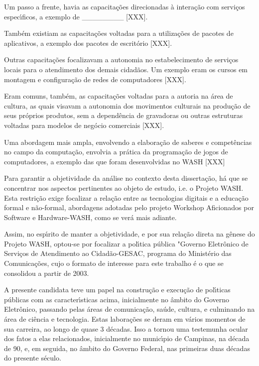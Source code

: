 \documentclass[
12pt,		%
openright,	%
twoside,  %
a4paper,			%
chapter=TITLE,		%
english,			%
french,				%
spanish,			%
brazil				%
]{USPSC-classe/USPSC}
\begin{document}
Um passo a frente, havia as capacita\c{c}\~oes direcionadas \`a intera\c{c}\~ao com servi\c{c}os espec\'{\i}ficos, a exemplo de \_\_\_\_\_\_\_\_ [XXX].




Tamb\'em existiam as capacita\c{c}\~oes voltadas para a utiliza\c{c}\~oes de pacotes de aplicativos, a exemplo dos pacotes de escrit\'orio [XXX].




Outras capacita\c{c}\~oes focalizavam a autonomia no estabelecimento de servi\c{c}os locais para o atendimento dos demais cidad\~aos. Um exemplo eram os cursos em montagem e configura\c{c}\~ao de redes de computadores [XXX].




Eram comuns, tamb\'em, as capacita\c{c}\~oes voltadas para a autoria na \'area de cultura, as quais visavam a autonomia dos movimentos culturais na produ\c{c}\~ao de seus pr\'oprios produtos, sem a depend\^encia de gravadoras ou outras estruturas voltadas para modelos de neg\'ocio comerciais [XXX].




Uma abordagem mais ampla, envolvendo a elabora\c{c}\~ao de saberes e compet\^encias no campo da computa\c{c}\~ao, envolvia a pr\'atica da programa\c{c}\~ao de jogos de computadores, a exemplo das que foram desenvolvidas no WASH [XXX]




Para garantir a objetividade da an\'alise no contexto desta disserta\c{c}\~ao, h\'a que se concentrar nos aspectos pertinentes ao objeto de estudo, i.e. o Projeto WASH. Esta restri\c{c}\~ao exige focalizar a rela\c{c}\~ao entre as tecnologias digitais e a educa\c{c}\~ao formal e n\~ao-formal, abordagens adotadas pelo projeto Workshop Aficionados por Software e Hardware-WASH, como se ver\'a mais adiante.




Assim, no esp\'{\i}rito de manter a objetividade, e por sua rela\c{c}\~ao direta na g\^enese do Projeto WASH, optou-se por focalizar a pol\'{\i}tica p\'ublica "Governo Eletr\^onico de Servi\c{c}os de Atendimento ao Cidad\~ao-GESAC, programa do  Minist\'erio das Comunica\c{c}\~oes, cujo o formato de interesse para este trabalho \'e o que se consolidou a partir de 2003.




A presente candidata teve um papel na constru\c{c}\~ao e execu\c{c}\~ao de pol\'{\i}ticas p\'ublicas com as caracter\'{\i}sticas acima, inicialmente no \^ambito do Governo Eletr\^onico, passando pelas \'areas de comunica\c{c}\~ao, sa\'ude, cultura, e culminando na \'area de ci\^encia e tecnologia. Estas labora\c{c}\~oes  se deram em v\'arios momentos de sua carreira, ao longo de quase 3 d\'ecadas. Isso a tornou uma testemunha ocular dos fatos a elas relacionados, inicialmente no  munic\'{\i}pio de Campinas, na d\'ecada de 90, e, em seguida, no \^ambito do Governo Federal, nas primeiras duas d\'ecadas do presente s\'eculo.
\end{document}
